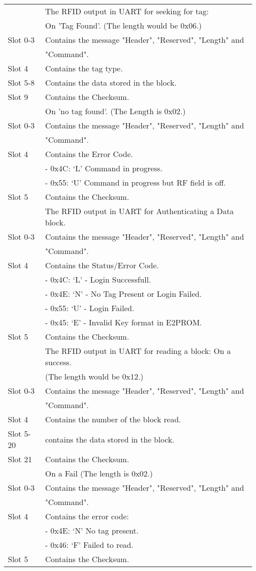 \begin{tabular}{|l|l|}
\hline
\hline
& The RFID output in UART for seeking for tag:\\
&  On 'Tag Found'. (The length would be 0x06.)\\
\hline
Slot 0-3 & Contains the message "Header", "Reserved", "Length" and\\
& "Command".\\
Slot 4 & Contains the tag type. \\
Slot 5-8 & Contains the data stored in the block.\\
Slot 9 & Contains the Checksum.\\
\hline
&On 'no tag found'. (The Length is 0x02.)\\
\hline
Slot 0-3 & Contains the message "Header", "Reserved", "Length" and\\
& "Command".\\
Slot 4 & Contains the Error Code.\\
& \indent - 0x4C: `L' Command in progress.\\
& \indent - 0x55: `U' Command in progress but RF field is off.\\
Slot 5 & Contains the Checksum.\\
\hline
\hline
&The RFID output in UART for Authenticating a Data block.\\
\hline
Slot 0-3 & Contains the message "Header", "Reserved", "Length" and\\
& "Command".\\
Slot 4 & Contains the Status/Error Code.\\
& \indent - 0x4C: `L' - Login Successfull.\\
& \indent - 0x4E: `N' - No Tag Present or Login Failed.\\
& \indent - 0x55: `U' - Login Failed.\\
& \indent - 0x45: `E' - Invalid Key format in E2PROM.\\
Slot 5 & Contains the Checksum.\\
\hline
\hline 
& The RFID output in UART for reading a block: On a success.\\
& (The length would be 0x12.) \\
\hline
Slot 0-3 & Contains the message "Header", "Reserved", "Length" and\\
& "Command".\\
Slot 4 & Contains the number of the block read. \\
Slot 5-20 & contains the data stored in the block.\\
Slot 21 & Contains the Checksum.\\
\hline
&On a Fail (The length is 0x02.)\\
\hline
Slot 0-3 & Contains the message "Header", "Reserved", "Length" and\\
& "Command".\\
Slot 4 & Contains the error code:\\
& \indent - 0x4E: `N' No tag present.\\
& \indent - 0x46: `F' Failed to read.\\
Slot 5 & Contains the Checksum.\\
\hline
\end{tabular}